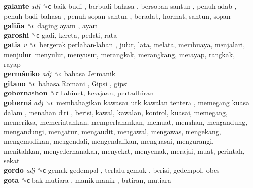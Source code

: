 \textbf{galante} \emph{adj}  ␝ϲ   baik budi ,  berbudi bahasa ,  bersopan-santun ,  penuh adab ,  penuh budi bahasa ,  penuh sopan-santun , beradab, hormat, santun, sopan  \\
\textbf{galiña} ␝ϲ   daging ayam , ayam  \\
\textbf{garoshi} ␝ϲ  gadi, kereta, pedati, rata  \\
\textbf{gatia} \emph{v}  ␝ϲ   bergerak perlahan-lahan , julur, lata, melata, membuaya, menjalari, menjulur, menyulur, menyusur, merangkak, merangkang, merayap, rangkak, rayap  \\
\textbf{germániko} \emph{adj}  ␝ϲ   bahasa Jermanik   \\
\textbf{gitano} ␝ϲ   bahasa Romani ,  Gipsi , gipsi  \\
\textbf{gobernashon} ␝ϲ  kabinet, kerajaan, pentadbiran  \\
\textbf{goberná} \emph{adj}  ␝ϲ   membahagikan kawasan utk kawalan tentera ,  memegang kuasa dalam ,  menahan diri , berisi, kawal, kawalan, kontrol, kuasai, memegang, memeriksa, memerintahkan, memperlahankan, memuat, menahan, mengandung, mengandungi, mengatur, mengaudit, mengawal, mengawas, mengekang, mengemudikan, mengendali, mengendalikan, menguasai, mengurangi, menitahkan, menyederhanakan, menyekat, menyemak, merajai, muat, perintah, sekat  \\
\textbf{gordo} \emph{adj}  ␝ϲ   gemuk gedempol ,  terlalu gemuk , berisi, gedempol, obes  \\
\textbf{gota} ␝ϲ   bak mutiara ,  manik-manik , butiran, mutiara  \\
